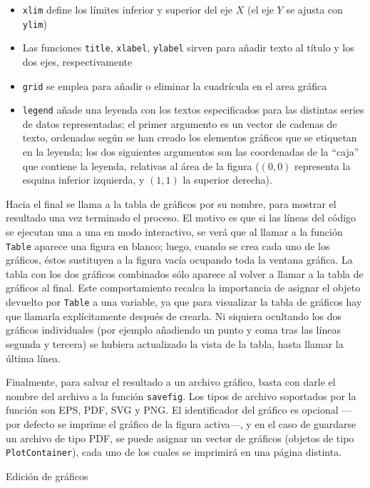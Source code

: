 ﻿\documentclass{article}
\newcommand{\code}{\texttt}
\begin{document}
\begin{itemize}
  \item \code{xlim} define los límites inferior y superior del eje $X$ (el eje $Y$ se ajusta con \code{ylim})
  \item Las funciones \code{title}, \code{xlabel}, \code{ylabel} sirven para añadir texto al título y los dos ejes, respectivamente
  \item \code{grid} se emplea para añadir o eliminar la cuadrícula en el area gráfica
  \item \code{legend} añade una leyenda con los textos especificados para las distintas series de datos representadas; el primer argumento es un vector de cadenas de texto, ordenadas según se han creado los elementos gráficos que se etiquetan en la leyenda; los dos siguientes argumentos son las coordenadas de la ``caja'' que contiene la leyenda, relativas al área de la figura ($(0,0)$ representa la esquina inferior izquierda, y $(1,1)$ la superior derecha).
\end{itemize}

Hacia el final se llama a la tabla de gráficos por su nombre, para mostrar el resultado una vez terminado el proceso. El motivo es que si las líneas del código se ejecutan una a una en modo interactivo, se verá que al llamar a la función \code{Table} aparece una figura en blanco; luego, cuando se crea cada uno de los gráficos, éstos sustituyen a la figura vacía ocupando toda la ventana gráfica. La tabla con los dos gráficos combinados sólo aparece al volver a llamar a la tabla de gráficos al final. Este comportamiento recalca la importancia de asignar el objeto devuelto por \code{Table} a una variable, ya que para visualizar la tabla de gráficos hay que llamarla explícitamente después de crearla. Ni siquiera ocultando los dos gráficos individuales (por ejemplo añadiendo un punto y coma tras las líneas segunda y tercera) se hubiera actualizado la vista de la tabla, hasta llamar la última línea.

Finalmente, para salvar el resultado a un archivo gráfico, basta con darle el nombre del archivo a la función \code{savefig}. Los tipos de archivo soportados por la función son EPS, PDF, SVG y PNG. El identificador del gráfico es opcional ---por defecto se imprime el gráfico de la figura activa---, y en el caso de guardarse un archivo de tipo PDF, se puede asignar un vector de gráficos (objetos de tipo \code{PlotContainer}), cada uno de los cuales se imprimirá en una página distinta.


Edición de gráficos
\end{document}
